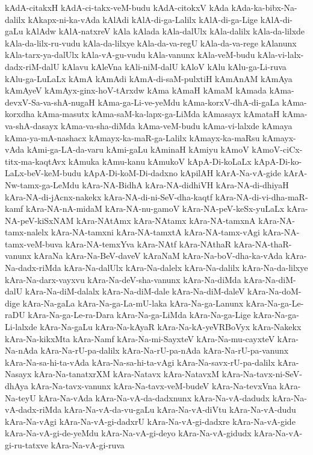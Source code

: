 {kAdA-citakxH
kAdA-ci-takx-veM-budu
kAdA-citokxV
kAda
kAda-ka-bibx-Na-dalilx
kAkapx-ni-ka-vAda
kAlAdi
kAlA-di-ga-Lalilx
kAlA-di-ga-Lige
kAlA-di-gaLu
kAlAdw
kAlA-natxreV
kAla
kAlada
kAla-dalUlx
kAla-dalilx
kAla-da-lilxde
kAla-da-lilx-ru-vudu
kAla-da-lilxye
kAla-da-va-regU
kAla-da-va-rege
kAlanunx
kAla-tarx-ya-dalUlx
kAla-vA-gu-vudu
kAla-vanunx
kAla-veM-budu
kAla-vi-lalx-dadx-riM-dalU
kAlavu
kAleVna
kAli-niM-dalU
kAloV
kAlu
kAlu-ga-Li-ruva
kAlu-ga-LuLaLx
kAmA
kAmAdi
kAmA-di-saM-pulxtiH
kAmAnAM
kAmAya
kAmAyeV
kAmAyx-ginx-hoV-tArxdw
kAma
kAmaH
kAmaM
kAmada
kAma-devxV-Sa-va-shA-nugaH
kAma-ga-Li-ve-yeMdu
kAma-korxV-dhA-di-gaLa
kAma-korxdha
kAma-masutx
kAma-saM-ka-lapx-ga-LiMda
kAmasayx
kAmataH
kAma-va-shA-dasayx
kAma-va-sha-diMda
kAma-veM-budu
kAma-vi-lalxde
kAmaya
kAma-ya-mA-nashacx
kAmayx-ka-maR-ga-Lalilx
kAmayx-ka-maRsu
kAmayx-vAda
kAmi-ga-LA-da-varu
kAmi-gaLu
kAminaH
kAmiyu
kAmoV
kAmoV-ciCx-titx-ma-kaqtAvx
kAmuka
kAmu-kanu
kAmukoV
kApA-Di-koLaLx
kApA-Di-ko-LaLx-beV-keM-budu
kApA-Di-koM-Di-dadxno
kApilAH
kArA-Na-vA-gide
kArA-Nw-tamx-ga-LeMdu
kAra-NA-BidhA
kAra-NA-didhiVH
kAra-NA-di-dhiyaH
kAra-NA-di-jAcnx-nakekx
kAra-NA-di-ni-SeV-dha-kaqtf
kAra-NA-di-vi-dha-maR-kamf
kAra-NA-nA-midaM
kAra-NA-nu-gamoV
kAra-NA-peV-keSx-yuLaLx
kAra-NA-peV-kiSxNAM
kAra-NAtAmx
kAra-NAtamx
kAra-NA-tamxnA
kAra-NA-tamx-nalelx
kAra-NA-tamxni
kAra-NA-tamxtA
kAra-NA-tamx-vAgi
kAra-NA-tamx-veM-buva
kAra-NA-temxYva
kAra-NAtf
kAra-NAthaR
kAra-NA-thaR-vanunx
kAraNa
kAra-Na-BeV-daveV
kAraNaM
kAra-Na-boV-dha-ka-vAda
kAra-Na-dadx-riMda
kAra-Na-dalUlx
kAra-Na-dalelx
kAra-Na-dalilx
kAra-Na-da-lilxye
kAra-Na-darx-vayxvu
kAra-Na-deV-sha-vanunx
kAra-Na-diMda
kAra-Na-diM-dalU
kAra-Na-diM-dalalx
kAra-Na-diM-dale
kAra-Na-diM-daleV
kAra-Na-doM-dige
kAra-Na-gaLa
kAra-Na-ga-La-mU-laka
kAra-Na-ga-Lanunx
kAra-Na-ga-Le-raDU
kAra-Na-ga-Le-ra-Dara
kAra-Na-ga-LiMda
kAra-Na-ga-Lige
kAra-Na-ga-Li-lalxde
kAra-Na-gaLu
kAra-Na-kAyaR
kAra-Na-kA-yeVRBoVyx
kAra-Nakekx
kAra-Na-kikxMta
kAra-Namf
kAra-Na-mi-SayxteV
kAra-Na-mu-cayxteV
kAra-Na-nAda
kAra-Na-rU-pa-dalilx
kAra-Na-rU-pa-nAda
kAra-Na-rU-pa-vanunx
kAra-Na-sa-hi-ta-vAda
kAra-Na-sa-hi-ta-vAgi
kAra-Na-savx-rU-pa-dalilx
kAra-Nasayx
kAra-Na-tanatxrXM
kAra-Natavx
kAra-NatavxM
kAra-Na-tavx-ni-SeV-dhAya
kAra-Na-tavx-vanunx
kAra-Na-tavx-veM-budeV
kAra-Na-tevxVna
kAra-Na-teyU
kAra-Na-vAda
kAra-Na-vA-da-dadxnunx
kAra-Na-vA-dadudx
kAra-Na-vA-dadx-riMda
kAra-Na-vA-da-vu-gaLu
kAra-Na-vA-diVtu
kAra-Na-vA-dudu
kAra-Na-vAgi
kAra-Na-vA-gi-dadxrU
kAra-Na-vA-gi-dadxre
kAra-Na-vA-gide
kAra-Na-vA-gi-de-yeMdu
kAra-Na-vA-gi-deyo
kAra-Na-vA-gidudx
kAra-Na-vA-gi-ru-tatxve
kAra-Na-vA-gi-ruva
}
